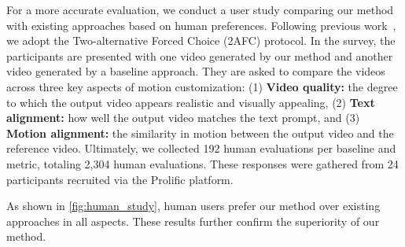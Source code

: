 For a more accurate evaluation, we conduct a user study comparing our method with existing approaches based on human preferences. Following previous work~\cite{md,dmt}, we adopt the Two-alternative Forced Choice (2AFC) protocol. In the survey, the participants are presented with one video generated by our method and another video generated by a baseline approach. They are asked to compare the videos across three key aspects of motion customization:
(1) {\bf Video quality:}  the degree to which the output video appears realistic and visually appealing,
(2) {\bf Text alignment:} how well the output video matches the text prompt, and
(3) {\bf Motion alignment:} the similarity in motion between the output video and the reference video. Ultimately, we collected 192 human evaluations per baseline and metric, totaling 2,304 human evaluations. These responses were gathered from 24 participants recruited via the Prolific platform.

As shown in \cref{fig:human_study}, human users prefer our method over existing approaches in all aspects. These results further confirm the superiority of our method.


